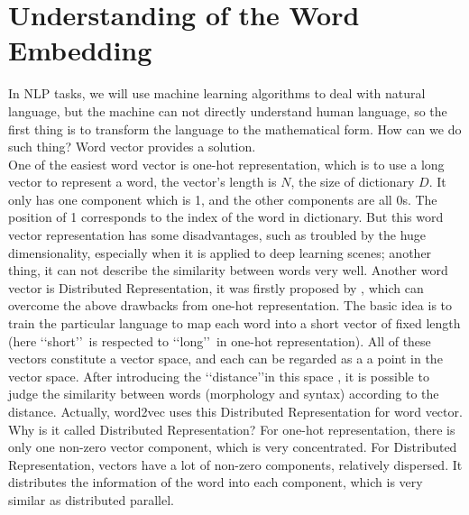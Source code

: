 \section{Understanding of the Word Embedding}
In NLP tasks, we will use machine learning algorithms to deal with natural language, but the machine can not directly understand human language, so the first thing is to transform the language to the mathematical form. How can we do such thing? Word vector provides a solution.\\

One of the easiest word vector is one-hot representation, which is to use a long vector to represent a word, the vector's length is  $N$, the size of dictionary $D$. It only has one component which is 1, and the other components are all 0s. The position of 1 corresponds to the index of the word in dictionary. But this word vector representation has some disadvantages, such as troubled by the huge dimensionality, especially when it is applied to deep learning scenes; another thing, it can not describe the similarity between words very well. Another word vector is Distributed Representation, it was firstly proposed by \cite{williams1986learning}, which can overcome the above drawbacks from one-hot representation. The basic idea is to train the particular language to map each word into a short vector of fixed length (here \lq\lq short\rq\rq\ is respected to \lq\lq long\rq\rq\ in one-hot representation). All of these vectors constitute a vector space, and each can be regarded as a a point in the vector space. After introducing the \lq\lq distance\rq\rq in this space , it is possible to judge the similarity between words (morphology and syntax) according to the distance. Actually, word2vec uses this Distributed Representation for word vector.\\

Why is it called Distributed Representation? For one-hot representation, there is only one non-zero vector component, which is very concentrated. For Distributed Representation, vectors have a lot of non-zero components, relatively dispersed. It distributes the information of the word into each component, which is very similar as distributed parallel.\\

